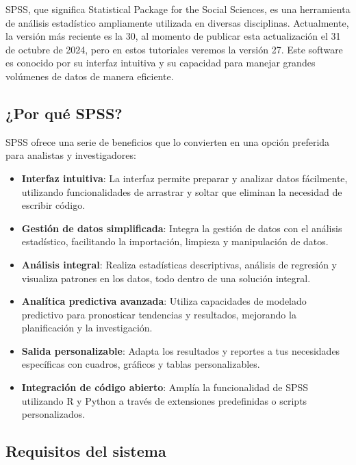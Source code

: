 \documentclass[
  letterpaper,
  DIV=11,
  numbers=noendperiod]{scrreprt}
\begin{document}

SPSS, que significa Statistical Package for the Social Sciences, es una
herramienta de análisis estadístico ampliamente utilizada en diversas
disciplinas. Actualmente, la versión más reciente es la 30, al momento
de publicar esta actualización el 31 de octubre de 2024, pero en estos
tutoriales veremos la versión 27. Este software es conocido por su
interfaz intuitiva y su capacidad para manejar grandes volúmenes de
datos de manera eficiente.

\subsection*{¿Por qué SPSS?}\label{por-quuxe9-spss}

SPSS ofrece una serie de beneficios que lo convierten en una opción
preferida para analistas y investigadores:

\begin{itemize}
\item
  \textbf{Interfaz intuitiva}: La interfaz permite preparar y analizar
  datos fácilmente, utilizando funcionalidades de arrastrar y soltar que
  eliminan la necesidad de escribir código.
\item
  \textbf{Gestión de datos simplificada}: Integra la gestión de datos
  con el análisis estadístico, facilitando la importación, limpieza y
  manipulación de datos.
\item
  \textbf{Análisis integral}: Realiza estadísticas descriptivas,
  análisis de regresión y visualiza patrones en los datos, todo dentro
  de una solución integral.
\item
  \textbf{Analítica predictiva avanzada}: Utiliza capacidades de
  modelado predictivo para pronosticar tendencias y resultados,
  mejorando la planificación y la investigación.
\item
  \textbf{Salida personalizable}: Adapta los resultados y reportes a tus
  necesidades específicas con cuadros, gráficos y tablas
  personalizables.
\item
  \textbf{Integración de código abierto}: Amplía la funcionalidad de
  SPSS utilizando R y Python a través de extensiones predefinidas o
  scripts personalizados.
\end{itemize}

\subsection*{Requisitos del sistema}\label{requisitos-del-sistema}
\end{document}
